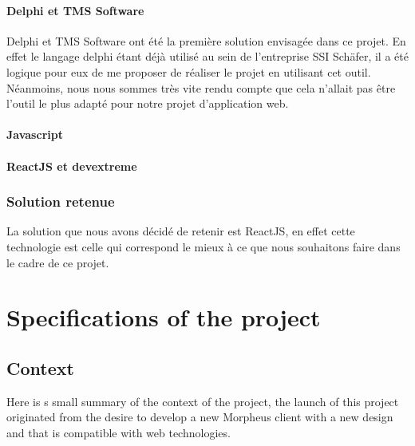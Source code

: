 \documentclass[a4paper, 12pt, french]{article}
\begin{document}
				\paragraph{Delphi et TMS Software\\}%
					Delphi et TMS Software ont été la première solution envisagée dans ce projet. En effet le langage delphi étant déjà utilisé au sein de l'entreprise SSI Schäfer, il a été logique pour eux de me proposer de réaliser le projet en utilisant cet outil. Néanmoins, nous nous sommes très vite rendu compte que cela n'allait pas être l'outil le plus adapté pour notre projet d'application web.\\
				\paragraph{Javascript\\}%
				\paragraph{ReactJS et devextreme\\}%
		
			\subsubsection{Solution retenue}
				La solution que nous avons décidé de retenir est ReactJS, en effet cette technologie est celle qui correspond le mieux à ce que nous souhaitons faire dans le cadre de ce projet.

	\section{Specifications of the project}%
		\subsection{Context}
			Here is s small summary of the context of the project, the launch of this project originated from the desire to develop a new Morpheus client with a new design and that is compatible with web technologies.
\end{document}
